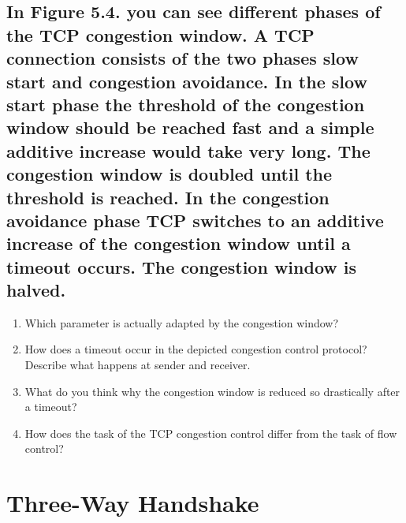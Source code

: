 \documentclass[a4paper,
			llpt,
			solution,
			accentcolor=tud2d,
			colorbacktitle
			]
			{tudexercise}
\begin{document}
\subsection{In Figure 5.4. you can see different phases of the TCP congestion window. A TCP connection consists of the two phases slow start and congestion avoidance. In the slow start phase the threshold of the congestion window should be reached fast and a simple additive increase would take very long. The congestion window is doubled until the threshold is reached. In the congestion avoidance phase TCP switches to an additive increase of the congestion window until a timeout occurs. The congestion window is halved.}
\begin{enumerate}
\item Which parameter is actually adapted by the congestion window?
\item How does a timeout occur in the depicted congestion control protocol? Describe what
happens at sender and receiver.
\item What do you think why the congestion window is reduced so drastically after a timeout?
\item How does the task of the TCP congestion control differ from the task of flow control?
\end{enumerate}
\section{Three-Way Handshake}
\end{document}
